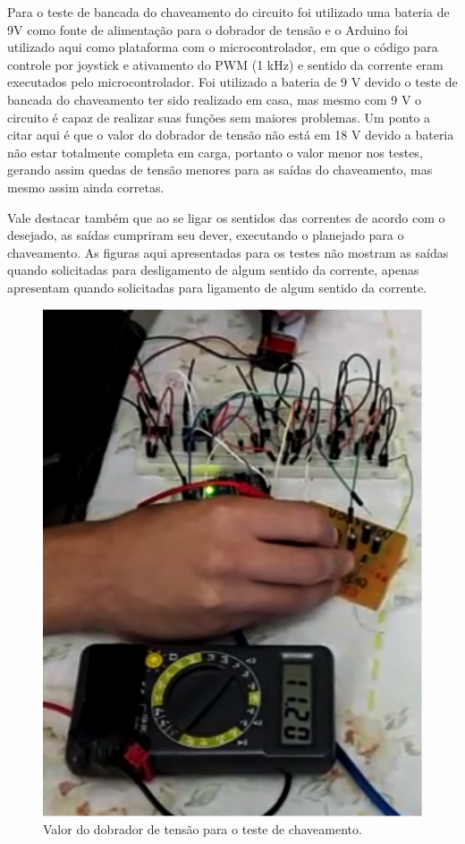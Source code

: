 \begin{anexosenv}
      Para o teste de bancada do chaveamento do circuito foi utilizado uma bateria de 9V como fonte de alimentação para o dobrador de tensão e o Arduino foi utilizado aqui como plataforma com o microcontrolador, em que o código para controle por joystick e ativamento do PWM (1 kHz) e sentido da corrente eram executados pelo microcontrolador. Foi utilizado a bateria de 9 V devido o teste de bancada do chaveamento ter sido realizado em casa, mas mesmo com 9 V o circuito é capaz de realizar suas funções sem maiores problemas. Um ponto a citar aqui é que o valor do dobrador de tensão não está em 18 V devido a bateria não estar totalmente completa em carga, portanto o valor menor nos testes, gerando assim quedas de tensão menores para as saídas do chaveamento, mas mesmo assim ainda corretas.

      Vale destacar também que ao se ligar os sentidos das correntes de acordo com o desejado, as saídas cumpriram seu dever, executando o planejado para o chaveamento. As figuras aqui apresentadas para os testes não mostram as saídas  quando solicitadas para desligamento de algum sentido da corrente, apenas apresentam quando solicitadas para ligamento de algum sentido da corrente.

      \begin{figure}
          \begin{center}
              \includegraphics{figuras/teste_alimentacao_1.png}
          \end{center}
          \caption{Valor do dobrador de tensão para o  teste de chaveamento.}
          \label{fig:teste_alimentacao_1.png}
      \end{figure}


\end{anexosenv}

